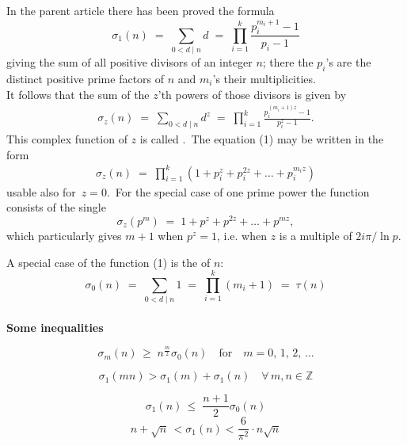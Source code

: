 \documentclass[12pt]{article}
\begin{document}
In the parent article there has been proved the formula
$$
\sigma_1(n) \;=\; \sum_{0 < d \mid n}\!d \;=\;
\prod_{i=1}^k\frac{p_i^{m_i+1}-1}{p_i-1}
$$
giving the sum of all positive divisors of an integer $n$; 
there the $p_i$'s are the distinct positive prime factors of $n$ and $m_i$'s their multiplicities.\\

It follows that the sum of the $z$'th powers of those divisors is given by
\begin{align}
\sigma_z(n) \;=\; \sum_{0 < d \mid n}\!d^z \;=\;
\prod_{i=1}^k\frac{p_i^{(m_i+1)z}-1}{p_i^z-1}.
\end{align}
This complex function of $z$ is called 
{\it {}}.\, The 
equation (1) may be written in the form
\begin{align}
\sigma_z(n)\;=\; 
\prod_{i=1}^k(1+p_i^z+p_i^{2z}+\ldots+p_i^{m_iz})
\end{align}
usable also for\, $z = 0$.\, For the special case of one prime 
power the function consists of the single 
$$\sigma_z(p^m) \;=\; 1+p^z+p^{2z}+\ldots+p^{mz},$$
which particularly gives $m\!+\!1$ when $p^z = 1$, i.e. when $z$ 
is a multiple of $2i\pi/\ln{p}$.


A special case of the function (1) is the 
 of $n$:
$$
\sigma_0(n) \;=\; \sum_{0 < d \mid n}\!1 \;=\;
\prod_{i=1}^k(m_i+1) \;=\; \tau(n)
$$\\








\textbf{Some inequalities}

$$\sigma_m(n)\,\ge\;n^{\frac{m}{2}}\sigma_0(n)
\quad\mbox{for}\quad m = 0,\,1,\,2,\,\ldots$$

$$\sigma_1(mn) > \sigma_1(m)+\sigma_1(n) 
\quad \forall\, m, n \in \mathbb{Z}$$

$$\sigma_1(n)\,\le\;\frac{n\!+\!1}{2}\sigma_0(n)$$
$$n\!+\!\sqrt{n} \,< \sigma_1(n) < 
\frac{6}{\pi^2}\!\cdot\!n\sqrt{n}$$
\end{document}
